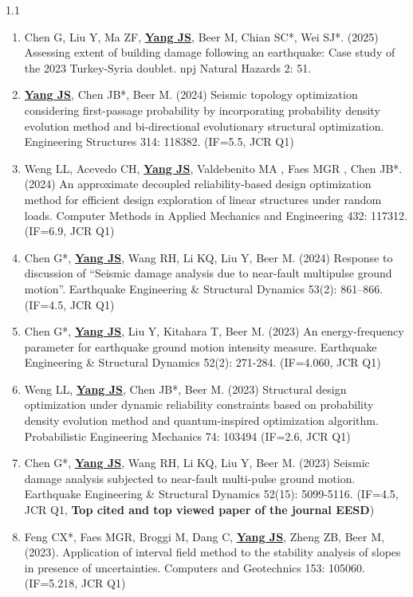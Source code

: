 \documentclass{resume}
\begin{document}
\begin{spacing}{1.1}
\begin{enumerate} [itemsep=3pt,topsep=2pt]
  \item Chen G, Liu Y, Ma ZF, \underline{\textbf{Yang JS}}, Beer M, Chian SC*, Wei SJ*. (2025) Assessing extent of building damage following an earthquake: Case study of the 2023 Turkey-Syria doublet. npj Natural Hazards 2: 51. 

  \item \underline{\textbf{Yang JS}}, Chen JB*, Beer M. (2024) Seismic topology optimization considering first-passage probability by incorporating probability density evolution method and bi-directional evolutionary structural optimization. Engineering Structures 314: 118382. (IF=5.5, JCR Q1)

  \item Weng LL, Acevedo CH, \underline{\textbf{Yang JS}}, Valdebenito MA , Faes MGR , Chen JB*. (2024) An approximate decoupled reliability-based design optimization method for efficient design exploration of linear structures under random loads. Computer Methods in Applied Mechanics and Engineering 432: 117312. (IF=6.9, JCR Q1)

  \item Chen G*, \underline{\textbf{Yang JS}}, Wang RH, Li KQ, Liu Y, Beer M. (2024) Response to discussion of “Seismic damage analysis due to near-fault multipulse ground motion”.  Earthquake Engineering \& Structural Dynamics 53(2): 861–866. (IF=4.5, JCR Q1)

  \item Chen G*, \underline{\textbf{Yang JS}}, Liu Y, Kitahara T, Beer M. (2023) An energy-frequency parameter for earthquake ground motion intensity measure. Earthquake Engineering \& Structural Dynamics 52(2): 271-284. (IF=4.060, JCR Q1)

  \item Weng LL, \underline{\textbf{Yang JS}}, Chen JB*, Beer M. (2023) Structural design optimization under dynamic reliability constraints based on probability density evolution method and quantum-inspired optimization algorithm. Probabilistic Engineering Mechanics 74: 103494 (IF=2.6, JCR Q1)

  \item Chen G*, \underline{\textbf{Yang JS}}, Wang RH, Li KQ, Liu Y, Beer M. (2023) Seismic damage analysis subjected to near-fault multi-pulse ground motion. Earthquake Engineering \& Structural Dynamics 52(15): 5099-5116. (IF=4.5, JCR Q1, \textbf{Top cited and top viewed paper of the journal EESD})  
  
  \item Feng CX*, Faes MGR, Broggi M, Dang C, \underline{\textbf{Yang JS}}, Zheng ZB, Beer M, (2023). Application of interval field method to the stability analysis of slopes in presence of uncertainties. Computers and Geotechnics 153: 105060. (IF=5.218, JCR Q1)


\end{enumerate}
\end{spacing}
\end{document}
